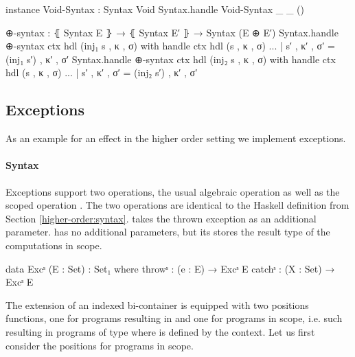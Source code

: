 \begin{code}
instance
  Void-Syntax : Syntax Void
  Syntax.handle Void-Syntax _ _ ()

  ⊕-syntax : ⦃ Syntax E ⦄ → ⦃ Syntax E′ ⦄ → Syntax (E ⊕ E′)
  Syntax.handle ⊕-syntax ctx hdl (inj₁ s , κ , σ) with handle ctx hdl (s , κ , σ)
  ... | s′ , κ′ , σ′ = (inj₁ s′) , κ′ , σ′
  Syntax.handle ⊕-syntax ctx hdl (inj₂ s , κ , σ) with handle ctx hdl (s , κ , σ)
  ... | s′ , κ′ , σ′ = (inj₂ s′) , κ′ , σ′
\end{code}


\subsection{Exceptions}
\label{higher-order:exceptions}

As an example for an effect in the higher order setting we implement exceptions.

\paragraph{Syntax}
Exceptions support two operations, the usual algebraic operation
 as well as the scoped operation .
The two operations are identical to the Haskell definition from Section
\ref{higher-order:syntax}.
 takes the thrown exception as an additional parameter.
 has no additional parameters, but its 
stores the result type of the computations in scope.

\begin{code}
data Excˢ (E : Set) : Set₁ where
  throwˢ  : (e : E)    → Excˢ E
  catchˢ  : (X : Set)  → Excˢ E
\end{code}
The extension of an indexed bi-container is equipped with two positions
functions, one for programs resulting in
\AgdaSpace{}\AgdaSpace{}
and one for programs in scope, i.e. such resulting in programs of type
\AgdaSpace{}\AgdaSpace{}
where  is defined by the context.
Let us first consider the positions for programs in scope.


